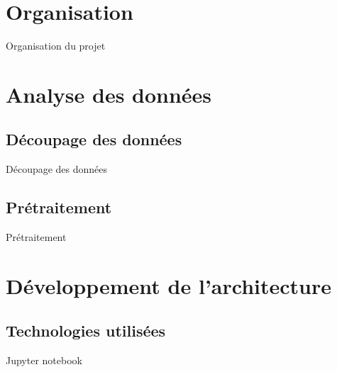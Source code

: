 \documentclass[10pt,handout]{beamer}
\begin{document}
\section{Organisation}
\begin{frame}{Organisation du projet}
    
\end{frame}

\section{Analyse des données}
\subsection{Découpage des données}
\begin{frame}{Découpage des données}
    
\end{frame}

\subsection{Prétraitement}
\begin{frame}{Prétraitement}
\end{frame}

\section{Développement de l’architecture}
\subsection{Technologies utilisées}
\begin{frame}{Jupyter notebook}
    
\end{frame}
\end{document}
